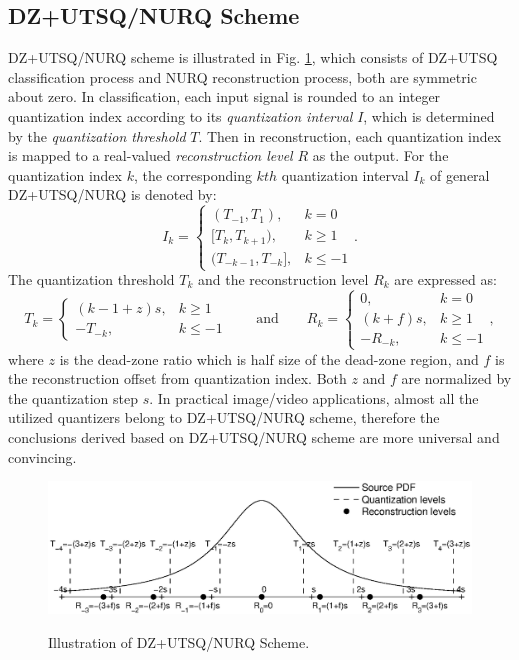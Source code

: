 \documentclass[smallabstract,smallcaptions]{dccpaper}
\begin{document}
\subsection{DZ+UTSQ/NURQ Scheme}
DZ+UTSQ/NURQ scheme is illustrated in Fig. \ref{fig:DZ+UTSQ_NURQ}, which consists of DZ+UTSQ classification process and NURQ reconstruction process, both are symmetric about zero. In classification, each input signal is rounded to an integer quantization index according to its \emph{quantization interval} $I$, which is determined by the \emph{quantization threshold} $T$. Then in reconstruction, each quantization index is mapped to a real-valued \emph{reconstruction level} $R$ as the output. For the quantization index $k$, the corresponding $kth$ quantization interval $I_{k}$ of general DZ+UTSQ/NURQ is denoted by:
\begin{equation}
\label{equ:interval}
I_{k}=\left\{ \begin{array}{ll}
(T_{-1}, T_{1}),         & k = 0 \\
{[T_{k}, T_{k+1})},        & k \ge 1 \\
(T_{-k-1}, T_{-k}],      & k \le -1
\end{array}\right. .
\end{equation}
The quantization threshold $T_{k}$ and the reconstruction level $R_{k}$ are expressed as:
\begin{equation}
\label{equ:DZ+UTSQ/NURQ}
T_{k}=\left\{ \begin{array}{ll}
(k-1+z)s, & k \ge 1 \\
-T_{-k},  & k \le -1
\end{array}\right.
\qquad \textrm{and} \qquad
R_{k}=\left\{ \begin{array}{ll}
0,        & k = 0 \\
(k+f)s,   & k \ge 1 \\
-R_{-k},  & k \le -1
\end{array}\right. ,
\end{equation}
where $z$ is the dead-zone ratio which is half size of the dead-zone region, and $f$ is the reconstruction offset from quantization index. Both $z$ and $f$ are normalized by the quantization step $s$. In practical image/video applications, almost all the utilized quantizers belong to DZ+UTSQ/NURQ scheme, therefore the conclusions derived based on DZ+UTSQ/NURQ scheme are more universal and convincing.

\begin{figure}[tp]
\centering
\includegraphics[width = 1.0\linewidth]{Figures/section2/DZ+UTSQ_NURQ}\\
\caption{\label{fig:DZ+UTSQ_NURQ}%
Illustration of DZ+UTSQ/NURQ Scheme.}
\vspace{5pt}
\end{figure}
\end{document}
